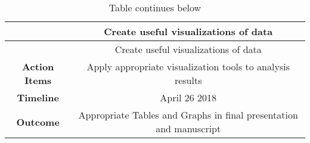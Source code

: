 \documentclass[]{elsarticle} %
\begin{document}
\begin{longtable}[]{@{}cc@{}}
\caption{Table continues below}\tabularnewline
\toprule
\begin{minipage}[b]{0.25\columnwidth}\centering\strut
~\strut
\end{minipage} & \begin{minipage}[b]{0.41\columnwidth}\centering\strut
Create useful visualizations of data\strut
\end{minipage}\tabularnewline
\midrule
\endfirsthead
\toprule
\begin{minipage}[b]{0.25\columnwidth}\centering\strut
~\strut
\end{minipage} & \begin{minipage}[b]{0.41\columnwidth}\centering\strut
Create useful visualizations of data\strut
\end{minipage}\tabularnewline
\midrule
\endhead
\begin{minipage}[t]{0.25\columnwidth}\centering\strut
\textbf{Action Items}\strut
\end{minipage} & \begin{minipage}[t]{0.41\columnwidth}\centering\strut
Apply appropriate visualization tools to analysis results\strut
\end{minipage}\tabularnewline
\begin{minipage}[t]{0.25\columnwidth}\centering\strut
\textbf{Timeline}\strut
\end{minipage} & \begin{minipage}[t]{0.41\columnwidth}\centering\strut
April 26 2018\strut
\end{minipage}\tabularnewline
\begin{minipage}[t]{0.25\columnwidth}\centering\strut
\textbf{Outcome}\strut
\end{minipage} & \begin{minipage}[t]{0.41\columnwidth}\centering\strut
Appropriate Tables and Graphs in final presentation and manuscript\strut
\end{minipage}\tabularnewline
\bottomrule
\end{longtable}
\end{document}
